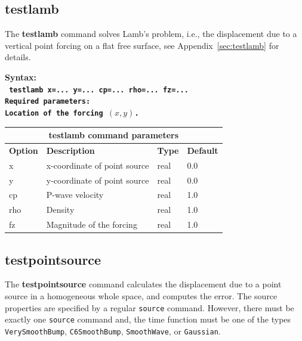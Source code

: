 \documentclass[11pt]{report}
\begin{document}
\subsection{testlamb}
\label{keyword:testlamb}
The {\bf testlamb} command solves Lamb's problem, i.e., the displacement due to a vertical point
forcing on a flat free surface, see Appendix~\ref{sec:testlamb} for details. 
\begin{flushleft}
\bf
Syntax:\\
\tt
testlamb x=... y=... cp=... rho=... fz=...
\\
\bf Required parameters:\\
\rm Location of the forcing $(x, y)$.
\end{flushleft}
%
\begin{center}
\begin{tabular}{|l|p{8cm}|l|l|} \hline
\multicolumn{4}{|c|}{\bf testlamb command  parameters}\\ \hline
\bf{Option} & \bf{Description} & \bf{Type} & \bf{Default} \\ \hline \hline
x    & x-coordinate of point source & real & 0.0 \\ \hline
y    & y-coordinate of point source & real & 0.0 \\ \hline
cp   & P-wave velocity              & real & 1.0 \\ \hline
rho  & Density                      & real & 1.0 \\ \hline
fz   & Magnitude of the forcing     & real & 1.0 \\ \hline
\end{tabular}
\end{center}

\subsection{testpointsource}
\label{keyword:pointsource}
The {\bf testpointsource} command calculates the displacement due to a point source in a homogeneous
whole space, and computes the error. The source properties are specified by a regular \verb+source+
command. However, there must be exactly one \verb+source+ command and, the time function must be
one of the types \verb+VerySmoothBump+, \verb+C6SmoothBump+, \verb+SmoothWave+, or \verb+Gaussian+.
\end{document}

